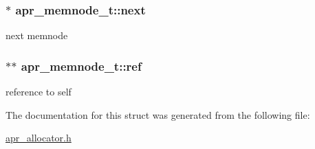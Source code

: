 \subsubsection[{\texorpdfstring{next}{next}}]{$\ast$ apr\+\_\+memnode\+\_\+t\+::next}\hypertarget{structapr__memnode__t_a07dd84ca152164d6bc283dbce99f8f78}{}\label{structapr__memnode__t_a07dd84ca152164d6bc283dbce99f8f78}
next memnode 
\subsubsection[{\texorpdfstring{ref}{ref}}]{$\ast$$\ast$ apr\+\_\+memnode\+\_\+t\+::ref}\hypertarget{structapr__memnode__t_ac68a939c0c3d48498ec0c0fde409c502}{}\label{structapr__memnode__t_ac68a939c0c3d48498ec0c0fde409c502}
reference to self 

The documentation for this struct was generated from the following file\+:\begin{DoxyCompactItemize}
\item 
\hyperlink{apr__allocator_8h}{apr\+\_\+allocator.\+h}\end{DoxyCompactItemize}
